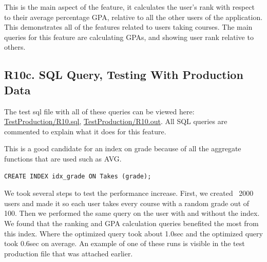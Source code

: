 \documentclass[12pt, a4paper]{article}
\begin{document}
This is the main aspect of the feature, it calculates the user's rank with respect to their average percentage GPA, relative to all the other users of the application.\\
This demonstrates all of the features related to users taking courses. The main queries for this feature are calculating GPAs, and showing user rank relative to others.
\subsection*{R10c. SQL Query, Testing With Production Data}
The test sql file with all of these queries can be viewed here: \underline{\href{https://github.com/Kggupta/DegreeMap/tree/main/Database/Queries/TestProduction}{TestProduction/R10.sql}}, \underline{\href{https://github.com/Kggupta/DegreeMap/tree/main/Database/Queries/TestProduction}{TestProduction/R10.out}}. All SQL queries are commented to explain what it does for this feature.

This is a good candidate for an index on grade because of all the aggregate functions that are used such as AVG.
\begin{verbatim}
CREATE INDEX idx_grade ON Takes (grade);
\end{verbatim}

We took several steps to test the performance increase. First, we created ~2000 users and made it so each user takes every course with a random grade out of 100. Then we performed the same query on the user with and without the index. We found that the ranking and GPA calculation queries benefited the most from this index. Where the optimized query took about 1.0sec and the optimized query took 0.6sec on average. An example of one of these runs is visible in the test production file that was attached earlier.
\end{document}
